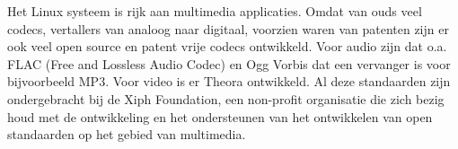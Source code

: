 Het Linux systeem is rijk aan multimedia applicaties. Omdat van ouds veel codecs, vertallers van analoog naar digitaal, voorzien waren van patenten zijn er ook veel open source en patent vrije codecs ontwikkeld. Voor audio zijn dat o.a. FLAC (Free and Lossless Audio Codec) en Ogg Vorbis dat een vervanger is voor bijvoorbeeld MP3. Voor video is er Theora ontwikkeld. Al deze standaarden zijn ondergebracht bij de Xiph Foundation, een non-profit organisatie die zich bezig houd met de ontwikkeling en het ondersteunen van het ontwikkelen van open standaarden op het gebied van multimedia.
